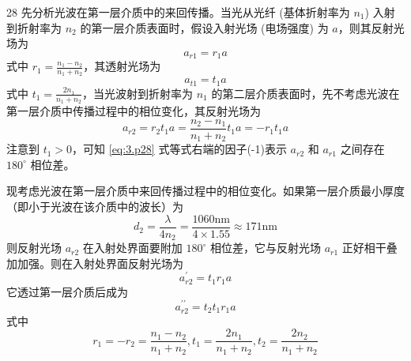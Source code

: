 \begin{solution}{28}
  先分析光波在第一层介质中的来回传播。当光从光纤 (基体折射率为 $n_{1}$) 入射到折射率为 $n_{2}$ 的第一层介质表面时，假设入射光场 (电场强度) 为 $a$，则其反射光场为
  \begin{equation}
    a_{r 1} = r_{1} a
    \label{eq:1.p28}
  \end{equation}
  式中 $r_1 = \frac{n_1 - n_2}{n_1 + n_2}$，其透射光场为
  \begin{equation}
    a_{t 1} = t_{1} a
    \label{eq:2.p28}
  \end{equation}
  式中 $t_1 = \frac{2n_1}{n_1 + n_2}$，当光波射到折射率为 $n_{1}$ 的第二层介质表面时，先不考虑光波在第一层介质中传播过程中的相位变化，其反射光场为
  \begin{equation}
    a_{r 2} = r_{2} t_{1} a = \frac{n_{2} - n_{1}}{n_{1} + n_{2}} t_{1} a = - r_{1} t_{1} a
    \label{eq:3.p28}
  \end{equation}
  注意到 $t_{1}>0$，可知 \eqref{eq:3.p28} 式等式右端的因子(-1)表示 $a_{r2}$ 和 $a_{r1}$ 之间存在 $180^{\circ}$ 相位差。

  现考虑光波在第一层介质中来回传播过程中的相位变化。如果第一层介质最小厚度（即小于光波在该介质中的波长）为
  \begin{equation}
    d_{2} = \frac{\lambda}{4 n_{2}} = \frac{1060 \mathrm{nm}}{4 \times 1.55} \approx 171 \mathrm{nm}
    \label{eq:4.p28}
  \end{equation}
  则反射光场 $a_{r2}$ 在入射处界面要附加 $180^{\circ}$ 相位差，它与反射光场 $a_{r1}$ 正好相干叠加加强。则在入射处界面反射光场为
  \begin{equation}
    a_{r 2}^{\prime} = t_{1} r_{1} a
    \label{eq:5.p28}
  \end{equation}
  它透过第一层介质后成为
  \begin{equation}
    a_{r 2}^{\prime \prime} = t_{2} t_{1} r_{1} a
    \label{eq:6.p28}
  \end{equation}
  式中
  \begin{equation}
    r_{1} = - r_{2} = \frac{n_{1} - n_{2}}{n_{1} + n_{2}}, t_{1} = \frac{2 n_{1}}{n_{1} + n_{2}}, t_{2} = \frac{2 n_{2}}{n_{1} + n_{2}}
    \label{eq:7.p28}
  \end{equation}


\end{solution}
